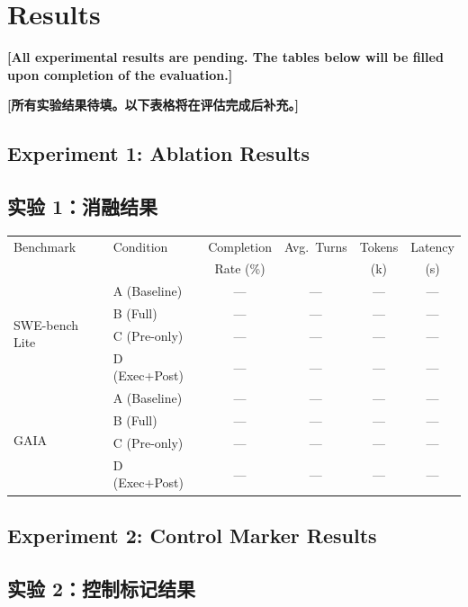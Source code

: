 \section{Results}
\label{sec:results}

\textbf{[All experimental results are pending. The tables below will be filled upon completion of the evaluation.]}
\begin{chinese}
\textbf{[所有实验结果待填。以下表格将在评估完成后补充。]}
\end{chinese}

\subsection{Experiment 1: Ablation Results}
\begin{chinese}
\subsection*{实验 1：消融结果}
\end{chinese}

\begin{center}
\begin{tabular}{llcccc}
\toprule
Benchmark & Condition & Completion & Avg.\ Turns & Tokens & Latency \\
 & & Rate (\%) & & (k) & (s) \\
\midrule
\multirow{4}{*}{SWE-bench Lite} & A (Baseline) & --- & --- & --- & --- \\
 & B (Full) & --- & --- & --- & --- \\
 & C (Pre-only) & --- & --- & --- & --- \\
 & D (Exec+Post) & --- & --- & --- & --- \\
\midrule
\multirow{4}{*}{GAIA} & A (Baseline) & --- & --- & --- & --- \\
 & B (Full) & --- & --- & --- & --- \\
 & C (Pre-only) & --- & --- & --- & --- \\
 & D (Exec+Post) & --- & --- & --- & --- \\
\bottomrule
\end{tabular}
\end{center}

\subsection{Experiment 2: Control Marker Results}
\begin{chinese}
\subsection*{实验 2：控制标记结果}
\end{chinese}

